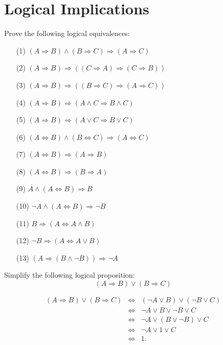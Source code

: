 \documentclass[11pt,paper=b5,footinclude,headinclude]{scrbook} %
\theoremstyle{remark}
\theoremstyle{definition} %
\theoremstyle{theorem} %
\newtheorem{ex}{Exercise\hypertarget{sol:\theex}}[chapter]
\begin{document}
\section{Logical Implications}

     \begin{ex} \label{ex:logical-implications}Prove the following logical equivalences:
        \begin{itemize}
            \item[(1)] $(A \Rightarrow B) \land (B \Rightarrow C) \Rightarrow (A \Rightarrow C)$
            \item[(2)] $(A \Rightarrow B) \Rightarrow ((C \Rightarrow A) \Rightarrow (C \Rightarrow B))$
            \item[(3)] $(A \Rightarrow B) \Rightarrow ((B \Rightarrow C) \Rightarrow (A \Rightarrow C))$
            \item[(4)] $(A \Rightarrow B) \Rightarrow (A \land C \Rightarrow B \land C)$
            \item[(5)] $(A \Rightarrow B) \Rightarrow (A \lor C \Rightarrow B \lor C)$
            \item[(6)] $(A \Leftrightarrow B) \land (B \Leftrightarrow C) \Rightarrow (A \Leftrightarrow C)$
            \item[(7)] $(A \Leftrightarrow B) \Rightarrow (A \Rightarrow B)$
            \item[(8)] $(A \Leftrightarrow B) \Rightarrow (B \Rightarrow A)$
            \item[(9)] $A \land (A \Leftrightarrow B) \Rightarrow B$
            \item[(10)] $\neg A \land (A \Leftrightarrow B) \Rightarrow \neg B$
            \item[(11)] $B \Rightarrow (A \Leftrightarrow A \land B)$
            \item[(12)] $\neg B \Rightarrow (A \Leftrightarrow A \lor B)$
            \item[(13)] $(A \Rightarrow (B \land \neg B)) \Rightarrow \neg A$
        \end{itemize}
    \end{ex} \begin{ex} Simplify the following logical proposition:
\[
(A \Rightarrow B) \lor (B \Rightarrow C)
\]
\begin{sol}
    
\begin{eqnarray*}
(A\Rightarrow B) \vee (B \Rightarrow C) &\Leftrightarrow & (\neg A \vee B) \vee (\neg B \vee C)\\
&\Leftrightarrow & \neg A \vee B \vee \neg B \vee C\\
&\Leftrightarrow & \neg A \vee (B \vee \neg B) \vee C\\
&\Leftrightarrow & \neg A \vee 1 \vee C\\
&\Leftrightarrow & 1.
\end{eqnarray*}
\end{sol}

 \end{ex}
\end{document}

